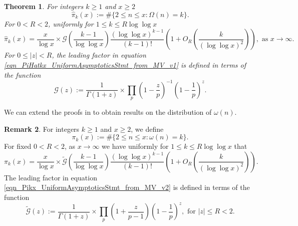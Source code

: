 \documentclass[11pt,reqno,a4letter]{article}
\numberwithin{equation}{section}
\numberwithin{figure}{section}
\numberwithin{table}{section}
\theoremstyle{plain}
\newtheorem{theorem}{Theorem}
\numberwithin{theorem}{section}
\theoremstyle{definition}
\newtheorem{remark}[theorem]{Remark}
\begin{document}
\begin{theorem}
\label{theorem_HatPi_ExtInTermsOfGz} 
For integers $k \geq 1$ and $x \geq 2$ 
$$\widehat{\pi}_k(x) := \#\{2 \leq n \leq x: \Omega(n)=k\}.$$ 
For $0 < R < 2$, uniformly for $1 \leq k \leq R \log\log x$ 
\begin{equation}
\label{eqn_PiHatkx_UniformAsymptoticsStmt_from_MV_v1}
\widehat{\pi}_k(x) = \frac{x}{\log x} \times \mathcal{G}\left(\frac{k-1}{\log\log x}\right) 
     \frac{(\log\log x)^{k-1}}{(k-1)!} \left(1 + O_R\left(\frac{k}{(\log\log x)^2}\right)\right), 
     \text{ as } x \rightarrow \infty. 
\end{equation}
For $0 \leq |z| < R$, the leading factor in 
equation \eqref{eqn_PiHatkx_UniformAsymptoticsStmt_from_MV_v1} 
is defined in terms of the function 
\[
\mathcal{G}(z) := \frac{1}{\Gamma(1+z)} \times 
	\prod_p \left(1-\frac{z}{p}\right)^{-1} \left(1-\frac{1}{p}\right)^z. 
\]
\end{theorem} 

We can extend the proofs in \cite[\S 7]{MV} to obtain 
results on the distribution of $\omega(n)$. 

\begin{remark} 
\label{remark_MV_Pikx_FuncResultsAnnotated_v1} 
For integers $k  \geq 1$ and $x \geq 2$, we define 
\[
\pi_k(x) := \#\{2 \leq n \leq x: \omega(n)=k\}.
\]
For fixed $0 < R < 2$, as $x \rightarrow \infty$ we have 
uniformly for $1 \leq k \leq R\log\log x$ that 
\begin{equation}
\label{eqn_Pikx_UniformAsymptoticsStmt_from_MV_v2} 
\pi_k(x) = \frac{x}{\log x} \times 
     \widetilde{\mathcal{G}}\left(\frac{k-1}{\log\log x}\right) 
     \frac{(\log\log x)^{k-1}}{(k-1)!} \left( 
     1 + O_R\left(\frac{k}{(\log\log x)^2}\right) 
     \right). 
\end{equation}
The leading factor in 
equation \eqref{eqn_Pikx_UniformAsymptoticsStmt_from_MV_v2} 
is defined in terms of the function 
\[
\widetilde{\mathcal{G}}(z) := \frac{1}{\Gamma(1+z)} \times 
	\prod_p \left(1 + \frac{z}{p-1}\right) \left(1 - \frac{1}{p}\right)^{z}, 
	\text{ for } |z| \leq R < 2. 
\]
\end{remark} 
\end{document}
